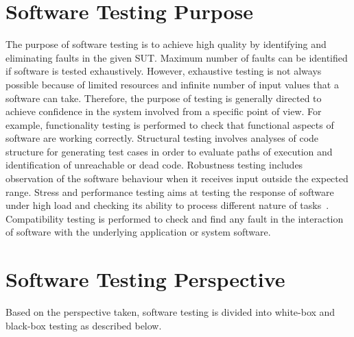 \section{Software Testing Purpose}
The purpose of software testing is to achieve high quality by identifying and eliminating faults in the given SUT. Maximum number of faults can be identified if software is tested exhaustively. However, exhaustive testing is not always possible because of limited resources and infinite number of input values that a software can take. Therefore, the purpose of testing is generally directed to achieve confidence in the system involved from a specific point of view. For example, functionality testing is performed to check that functional aspects of software are working correctly. Structural testing involves analyses of code structure for generating test cases in order to evaluate paths of execution and identification of unreachable or dead code. Robustness testing includes observation of the software behaviour when it receives input outside the expected range. Stress and performance testing aims at testing the response of software under high load and checking its ability to process different nature of tasks~\cite{cohen2005robustness}. Compatibility testing is performed to check and find any fault in the interaction of software with the underlying application or system software.

\section{Software Testing Perspective}
Based on the perspective taken, software testing is divided into white-box and black-box testing as described below.


